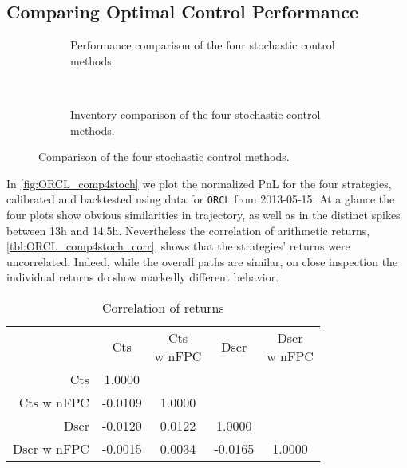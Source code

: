 \FloatBarrier
\subsection{Comparing Optimal Control Performance}

\begin{figure}
  \centering
\begin{subfigure}{\linewidth}
  \setlength{} 
  \setlength\figurewidth{\linewidth}
  
  \caption{Performance comparison of the four stochastic control methods.}
  \label{fig:ORCL_comp4stoch}
\end{subfigure}\\
\vspace{1cm}
\begin{subfigure}{\linewidth}
  \centering
  \setlength{} 
  \setlength\figurewidth{\linewidth}
  
  \caption{Inventory comparison of the four stochastic control methods.}
  \label{fig:ORCL_comp4stoch_inv}
\end{subfigure}%
\caption{Comparison of the four stochastic control methods.}
\end{figure}
In \autoref{fig:ORCL_comp4stoch} we plot the normalized PnL for the four strategies, calibrated and backtested using data for \texttt{ORCL} from 2013-05-15. At a glance the four plots show obvious similarities in trajectory, as well as in the distinct spikes between 13h and 14.5h. Nevertheless the correlation of arithmetic returns, \autoref{tbl:ORCL_comp4stoch_corr}, shows that the strategies' returns were uncorrelated. Indeed, while the overall paths are similar, on close inspection the individual returns do show markedly different behavior.
\begin{table}[H]
\centering
{}
\begin{tabular}{@{} r *{4}{c} @{}}
\toprule
& Cts & \cellbreak{t}{c}{Cts \\ w nFPC} & Dscr & \cellbreak{t}{c}{Dscr \\ w nFPC} \\
\cmidrule{2-5}
Cts          &  1.0000  & & & \\
Cts w nFPC   & -0.0109  &  1.0000 &  & \\
Dscr         & -0.0120  &  0.0122 &   1.0000 &  \\
Dscr w nFPC  & -0.0015  &  0.0034 &  -0.0165 &   1.0000 \\
\bottomrule
\end{tabular}
\caption{Correlation of returns}
\label{tbl:ORCL_comp4stoch_corr}
\end{table}
